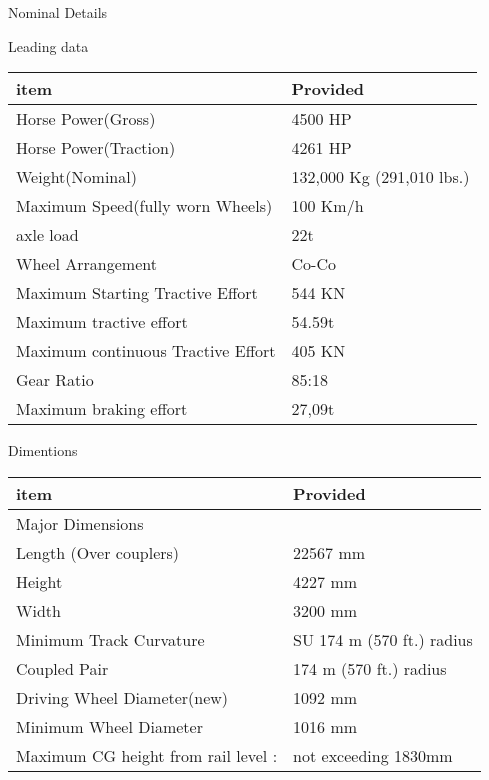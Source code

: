 \documentclass[
  ignorenonframetext,
]{beamer}
\begin{document}
\begin{frame}{Nominal Details}
\protect\hypertarget{nominal-details}{}
\begin{block}{Leading data}
\protect\hypertarget{leading-data}{}
\begin{longtable}[]{@{}ll@{}}
\toprule()
item & Provided \\
\midrule()
\endhead
Horse Power(Gross) & 4500 HP \\
Horse Power(Traction) & 4261 HP \\
Weight(Nominal) & 132,000 Kg (291,010 lbs.) \\
Maximum Speed(fully worn Wheels) & 100 Km/h \\
axle load & 22t \\
Wheel Arrangement & Co-Co \\
Maximum Starting Tractive Effort & 544 KN \\
Maximum tractive effort & 54.59t \\
Maximum continuous Tractive Effort & 405 KN \\
Gear Ratio & 85:18 \\
Maximum braking effort & 27,09t \\
\bottomrule()
\end{longtable}
\end{block}

\begin{block}{Dimentions}
\protect\hypertarget{dimentions}{}
\begin{longtable}[]{@{}ll@{}}
\toprule()
item & Provided \\
\midrule()
\endhead
Major Dimensions & \\
Length (Over couplers) & 22567 mm \\
Height & 4227 mm \\
Width & 3200 mm \\
Minimum Track Curvature & SU 174 m (570 ft.) radius \\
Coupled Pair & 174 m (570 ft.) radius \\
Driving Wheel Diameter(new) & 1092 mm \\
Minimum Wheel Diameter & 1016 mm \\
Maximum CG height from rail level : & not exceeding 1830mm \\
\bottomrule()
\end{longtable}


\begin{shaded}


\end{shaded}
\end{block}
\end{frame}
\end{document}

